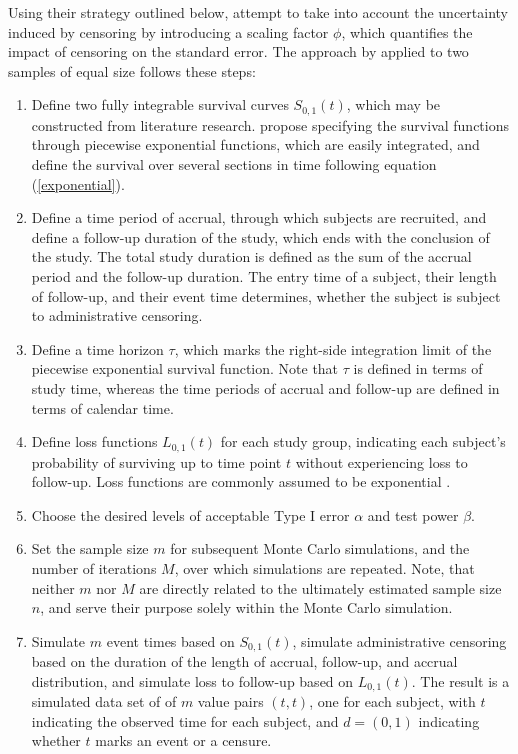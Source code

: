 \documentclass[main.tex]{subfiles}
\begin{document}
Using their strategy outlined below, \textcite{royston2013restricted} attempt to take into account the uncertainty induced by censoring by introducing a scaling factor $\phi$, which quantifies the impact of censoring on the standard error. The approach by \textcite{royston2013restricted} applied to two samples of equal size follows these steps:
\begin{enumerate}
    \item Define two fully integrable survival curves $S_{0,1}(t)$, which may be constructed from literature research. \textcite{royston2013restricted} propose specifying the survival functions through piecewise exponential functions, which are easily integrated, and define the survival over several sections in time following equation (\ref{exponential}).
    \item Define a time period of accrual, through which subjects are recruited, and define a follow-up duration of the study, which ends with the conclusion of the study. The total study duration is defined as the sum of the accrual period and the follow-up duration. The entry time of a subject, their length of follow-up, and their event time determines, whether the subject is subject to administrative censoring. 
    \item Define a time horizon $\tau$, which marks the right-side integration limit of the piecewise exponential survival function. Note that $\tau$ is defined in terms of study time, whereas the time periods of accrual and follow-up are defined in terms of calendar time.
    \item Define loss functions $L_{0,1}(t)$ for each study group, indicating each subject's probability of surviving up to time point $t$ without experiencing loss to follow-up. Loss functions are commonly assumed to be exponential \parencite{schemper1996note}.
    \item Choose the desired levels of acceptable Type I error $\alpha$ and test power $\beta$.
    \item Set the sample size $m$ for subsequent Monte Carlo simulations, and the number of iterations $M$, over which simulations are repeated. Note, that neither $m$ nor $M$ are directly related to the ultimately estimated sample size $n$, and serve their purpose solely within the Monte Carlo simulation.
    \item Simulate $m$ event times based on $S_{0,1}(t)$, simulate administrative censoring based on the duration of the length of accrual, follow-up, and accrual distribution, and simulate loss to follow-up based on $L_{0,1}(t)$. The result is a simulated data set of of $m$ value pairs $(t, t)$, one for each subject, with $t$ indicating the observed time for each subject, and $d=(0,1)$ indicating whether $t$ marks an event or a censure.

\end{enumerate}
\end{document}

